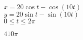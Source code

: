 {$x=20\cos t - \cos(10t)$\\$y=20\sin t - \sin(10t)$\\$0\leq t\leq 2\pi$

\noindent\begin{minipage}{\linewidth}
\centering
{}
\end{minipage}
}
{$410\pi$
}

